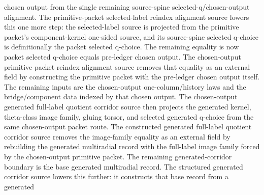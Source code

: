 \begin{definition}
  chosen output from the single remaining source-spine selected-q/chosen-output
  alignment.  The primitive-packet selected-label reindex alignment source
  lowers this one more step: the selected-label source is projected from the
  primitive packet's component-kernel one-sided source, and its source-spine
  selected q-choice is definitionally the packet selected q-choice.  The
  remaining equality is now packet selected q-choice equals pre-ledger chosen
  output.  The chosen-output primitive packet reindex alignment source
  removes that equality as an external field by constructing the primitive
  packet with the pre-ledger chosen output itself.  The remaining inputs are
  the chosen-output one-column/history laws and the bridge/component data
  indexed by that chosen output.  The chosen-output generated full-label
  quotient corridor source
  then projects the generated kernel, theta-class image family, gluing torsor,
  and selected generated q-choice from the same chosen-output packet route.
  The constructed generated full-label quotient corridor source
  removes the image-family equality as an external field by rebuilding the
  generated multiradial record with the full-label image family forced by the
  chosen-output primitive packet.  The remaining generated-corridor boundary is
  the base generated multiradial record.  The structured generated corridor
  source
  lowers this further: it constructs that base record from a generated

\end{definition}
